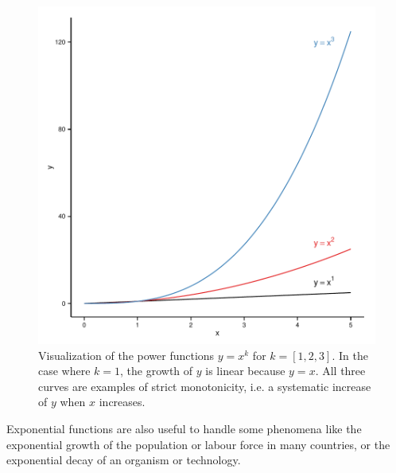 \begin{knitrout}
\color{fgcolor}\begin{figure}[]

\includegraphics[width=\linewidth]{images/math-fun_xpowerk} \caption{Visualization of the power functions $y = x^k$ for $k = [1,2,3]$. In the case where $k = 1$, the growth of $y$ is linear because $y = x$. All three curves are examples of strict monotonicity, i.e. a systematic increase of $y$ when $x$ increases.\label{fig:fun_xpowerk}}
\end{figure}


\end{knitrout}


Exponential functions are also useful to handle some phenomena like the exponential growth of the population or labour force in many countries, or the exponential decay of an organism or technology.

